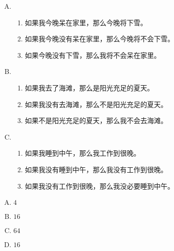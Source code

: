 {{        %
        \begin{practices}
            \begin{enumerate}[A.]
                \item
                {
                    \begin{enumerate}[1)]
                        \item 如果我今晚呆在家里，那么今晚将下雪。
                        \item 如果我今晚没有呆在家里，那么今晚将不会下雪。
                        \item 如果今晚没有下雪，那么我将不会呆在家里。
                    \end{enumerate}
                }
                \item
                {
                    \begin{enumerate}[1)]
                        \item 如果我去了海滩，那么是阳光充足的夏天。
                        \item 如果我没有去海滩，那么不是阳光充足的夏天。
                        \item 如果不是阳光充足的夏天，那么我不会去海滩。
                    \end{enumerate}
                }
                \item
                {
                    \begin{enumerate}[1)]
                        \item 如果我睡到中午，那么我工作到很晚。
                        \item 如果我没有睡到中午，那么我没有工作到很晚。
                        \item 如果我没有工作到很晚，那么我没必要睡到中午。
                    \end{enumerate}
                }
            \end{enumerate}
        \end{practices}

        \begin{practices}
            \begin{enumerate}[A.]
                \item $4$
                \item $16$
                \item $64$
                \item $16$
            \end{enumerate}
        \end{practices}
        
}}
